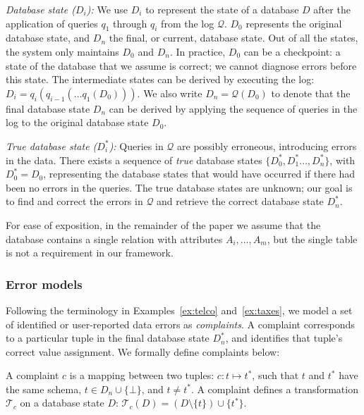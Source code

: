 \smallskip
\noindent
\emph{Database state ($D_i$):}
We use $D_i$ to represent the state of a database $D$ after the application of
queries $q_1$ through $q_i$ from the log $\mathcal{Q}$. $D_0$ represents the
original database state, and $D_n$ the final, or current, database state. Out
of all the states, the system only maintains $D_0$ and $D_n$. In practice,
$D_0$ can be a checkpoint: a state of the database that we assume is correct;
we cannot diagnose errors before this state. The intermediate states can be
derived by executing the log: $D_i=q_i(q_{i-1}(\dots q_1(D_0)))$. We also
write $D_n=\mathcal{Q}(D_0)$ to denote that the final database state $D_n$ can
be derived by applying the sequence of queries in the log to the original
database state $D_0$.

\smallskip
\noindent
\emph{True database state ($D_i^*$):}
Queries in $\mathcal{Q}$ are possibly erroneous, introducing errors in the
data. There exists a sequence of \emph{true} database states $\{D_0^*,
D_1^*\dots, D_n^*\}$, with $D_0^*=D_0$, representing the database states that
would have occurred if there had been no errors in the queries.
The true database states are unknown; our goal is to find and correct the errors in $\mathcal{Q}$ and retrieve the correct database state $D_n^*$.

For ease of exposition, in the remainder of the paper we assume that the
database contains a single relation with attributes $A_i,\ldots,A_m$,
but the single table is not a requirement in our framework.


\subsubsection*{Error models}

Following the terminology in Examples~\ref{ex:telco}
and~\ref{ex:taxes}, we model a set of identified or user-reported
data errors as \emph{complaints}. A complaint corresponds to a
particular tuple in the final database state $D_n^*$, and identifies
that tuple's correct value assignment. We formally define complaints
below:

\begin{definition}[Complaint]
    A complaint $c$ is a mapping between two tuples: $c: t\mapsto t^*$, such that $t$ and $t^*$ have the same schema, $t\in D_n\cup\{\bot\}$, and $t\neq t^*$. A complaint defines a
    transformation $\mathcal{T}_c$ on a database state $D$: $\mathcal{T}_c(D)
    = (D\setminus\{t\})\cup\{t^*\}$.
\end{definition}

